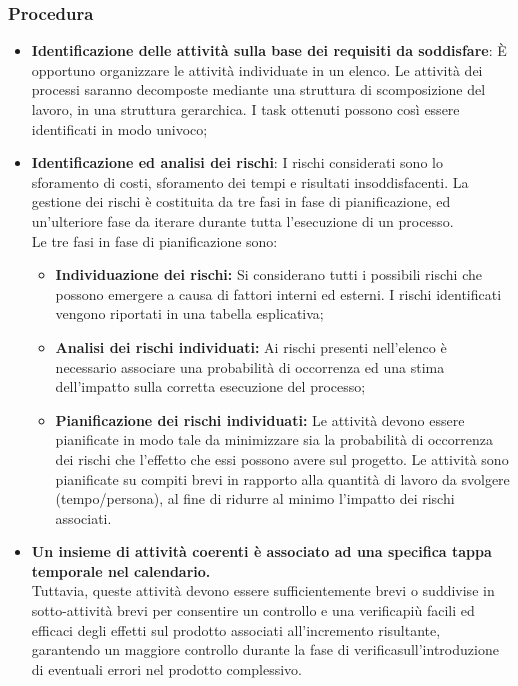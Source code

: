 \subsubsection{Procedura}
\begin{itemize}
    \item \textbf{Identificazione delle attività sulla base dei requisiti da soddisfare}: È opportuno organizzare le attività individuate in un elenco. Le attività dei processi saranno decomposte mediante una struttura di scomposizione del lavoro, in una struttura gerarchica. I task ottenuti possono così essere identificati in modo univoco;
    \item \textbf{Identificazione ed analisi dei rischi}: I rischi considerati sono lo sforamento di costi, sforamento dei tempi e risultati insoddisfacenti. La gestione dei rischi è costituita da tre fasi in fase di pianificazione, ed un'ulteriore fase da iterare durante tutta l'esecuzione di un processo. \\
    Le tre fasi in fase di pianificazione sono: 
    \begin{itemize}
     \item \textbf{Individuazione dei rischi:} Si considerano tutti i possibili rischi che possono emergere a causa di fattori interni ed esterni. I rischi identificati vengono riportati in una tabella esplicativa;
     \item \textbf{Analisi dei rischi individuati:} Ai rischi presenti nell'elenco è necessario associare una probabilità di occorrenza ed una stima dell'impatto sulla corretta esecuzione del processo;
     \item \textbf{Pianificazione dei rischi individuati:} Le attività devono essere pianificate in modo tale da minimizzare sia la probabilità di occorrenza dei rischi che l'effetto che essi possono avere sul progetto. Le attività sono pianificate su compiti brevi in rapporto alla quantità di lavoro da svolgere (tempo/persona), al fine di ridurre al minimo l'impatto dei rischi associati.
    \end{itemize}
     \item \textbf{Un insieme di attività coerenti è associato ad una specifica tappa temporale nel calendario.}\\ Tuttavia, queste attività devono essere sufficientemente brevi o suddivise in sotto-attività brevi per consentire un controllo e una verifica\glo più facili ed efficaci degli effetti sul prodotto associati all'incremento risultante, garantendo un maggiore controllo durante la fase di verifica\glo sull'introduzione di eventuali errori nel prodotto complessivo. \\ 

\end{itemize}

